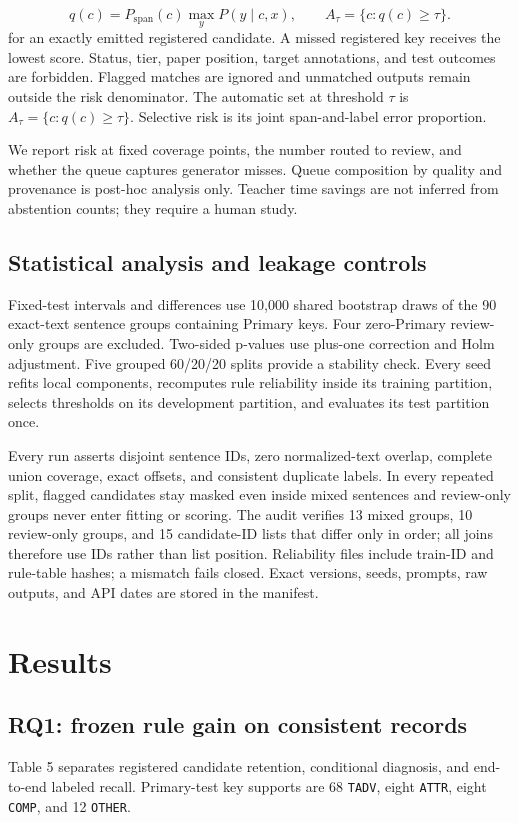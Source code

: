 \documentclass{CUP-JNL-NLP}
\begin{document}
\begin{equation}
q(c)=P_{\mathrm{span}}(c)\max_yP(y\mid c,x),\qquad A_\tau=\{c:q(c)\geq\tau\}.
\end{equation}
for an exactly emitted registered candidate. A missed registered key receives the lowest score. Status, tier, paper position, target annotations, and test outcomes are forbidden. Flagged matches are ignored and unmatched outputs remain outside the risk denominator. The automatic set at threshold $\tau$ is $A_\tau=\{c:q(c)\geq\tau\}$. Selective risk is its joint span-and-label error proportion.

We report risk at fixed coverage points, the number routed to review, and whether the queue captures generator misses. Queue composition by quality and provenance is post-hoc analysis only. Teacher time savings are not inferred from abstention counts; they require a human study.

\subsection{Statistical analysis and leakage controls}
Fixed-test intervals and differences use 10,000 shared bootstrap draws of the 90 exact-text sentence groups containing Primary keys. Four zero-Primary review-only groups are excluded. Two-sided p-values use plus-one correction and Holm adjustment. Five grouped 60/20/20 splits provide a stability check. Every seed refits local components, recomputes rule reliability inside its training partition, selects thresholds on its development partition, and evaluates its test partition once.

Every run asserts disjoint sentence IDs, zero normalized-text overlap, complete union coverage, exact offsets, and consistent duplicate labels. In every repeated split, flagged candidates stay masked even inside mixed sentences and review-only groups never enter fitting or scoring. The audit verifies 13 mixed groups, 10 review-only groups, and 15 candidate-ID lists that differ only in order; all joins therefore use IDs rather than list position. Reliability files include train-ID and rule-table hashes; a mismatch fails closed. Exact versions, seeds, prompts, raw outputs, and API dates are stored in the manifest.

\section{Results}
\subsection{RQ1: frozen rule gain on consistent records}
Table 5 separates registered candidate retention, conditional diagnosis, and end-to-end labeled recall. Primary-test key supports are 68 \texttt{TADV}, eight \texttt{ATTR}, eight \texttt{COMP}, and 12 \texttt{OTHER}.
\end{document}

